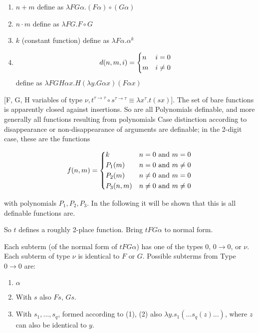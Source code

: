 \documentclass[11pt]{article}
\begin{document}
\begin{enumerate}
    \item \(n + m\) define as \(\lambda F G \alpha. (F \alpha) \circ (G \alpha)\)
    \item \(n \cdot m\) define as \(\lambda F G. F \circ G\)
    \item \(k\) (constant function) define as \(\lambda F \alpha . \alpha ^ k\)
    \item \[ d(n, m, i) =
        \begin{dcases}
            n & i = 0 \\
            m & i \neq 0 \\
        \end{dcases}
    \] define as \(\lambda F G H \alpha x. H(\lambda y. G \alpha x) (F \alpha x)\)
\end{enumerate}

[F, G, H variables of type \(\nu, t^{\tau \rightarrow \tau} \circ s^{\tau \rightarrow \tau} \equiv \lambda x^\tau. t(s x)\)]. The set of
bare functions is apparently closed against insertions. So are all Polynomials definable, and more generally all functions resulting from polynomials Case distinction according to disappearance or non-disappearance of arguments
are definable; in the 2-digit case, these are the functions

\[ f(n, m) =
        \begin{dcases}
            k & n = 0 \text{ and } m = 0 \\
            P_1(m) & n = 0 \text{ and } m \neq 0 \\
            P_2(m) & n \neq 0 \text{ and } m = 0 \\
            P_3(n, m) & n \neq 0 \text{ and } m \neq 0 \\
        \end{dcases}
\]

with polynomials \(P_1, P_2, P_3\). In the following it will be shown that this is all definable functions are.

So \(t\) defines a roughly 2-place function. Bring \(t F G \alpha\) to normal form.

Each subterm (of the normal form of \(t F G \alpha\)) has one of the types $0$, $0 \rightarrow 0$, or \(\nu\). Each subterm of type \(\nu\) is identical to $F$ or $G$. Possible subterms from Type \(0 \rightarrow 0\) are:

\begin{enumerate}
    \item \(\alpha\)
    \item With $s$ also $Fs$, $Gs$.
    \item With \(s_1, ..., s_q\), formed according to (1), (2) also \(\lambda y. s_1 (... s_q(z)...)\), where $z$ can also be identical to $y$.
\end{enumerate}
\end{document}
